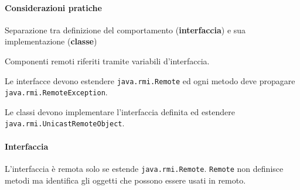 \documentclass[10pt]{article}
\begin{document}
\paragraph{Considerazioni pratiche}
\begin{list}{}{}
	\item Separazione tra definizione del comportamento (\textbf{interfaccia}) e sua implementazione (\textbf{classe})
	\item Componenti remoti riferiti tramite variabili d'interfaccia.
	\item Le interfacce devono estendere \texttt{java.rmi.Remote} ed ogni metodo deve propagare \texttt{java.rmi.RemoteException}.
	\item Le classi devono implementare l'interfaccia definita ed estendere \texttt{java.rmi.UnicastRemoteObject}.
\end{list}
\paragraph{Interfaccia} L'interfaccia è remota solo se estende \texttt{java.rmi.Remote}.
\texttt{Remote} non definisce metodi ma identifica gli oggetti che possono essere usati in remoto.
\end{document}
